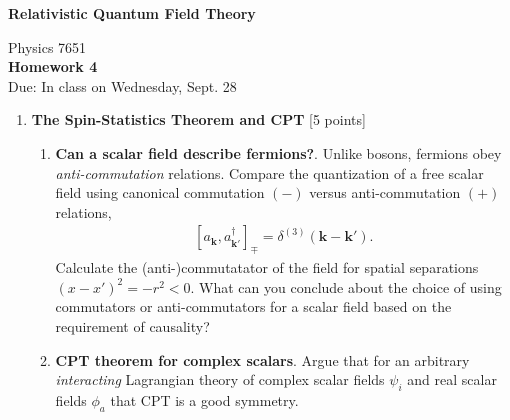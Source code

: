 \documentclass[12pt]{article}
\begin{document}
\vspace*{-1cm}
\begin{center}
{\LARGE \bf Relativistic Quantum Field Theory}

\vspace*{0.5cm}
{\Large Physics 7651} \\
\vspace*{0.5cm}
{\Large {\bf Homework 4}\\
\vspace*{0.5cm}
Due: In class on Wednesday, Sept. 28}
\end{center}
\begin{enumerate}

\item  {\bf The Spin-Statistics Theorem and CPT} [5 points]


\begin{enumerate}
	\item \textbf{Can a scalar field describe fermions?}.
	Unlike bosons, fermions obey \textit{anti-commutation} relations.
	Compare the quantization of a free scalar field using canonical commutation $(-)$ versus anti-commutation $(+)$ relations,
	\begin{align*}
		\left[a_\mathbf{k},a^\dag_{\mathbf{k'}}\right]_{\mp} = \delta^{(3)}\left(\mathbf{k}-\mathbf{k'}\right).
	\end{align*}
	Calculate the (anti-)commutatator of the field for spatial separations $(x-x')^2=-r^2<0$. What can you conclude about the choice of using commutators or anti-commutators for a scalar field based on the requirement of causality? 
	\item \textbf{CPT theorem for complex scalars}. Argue that for an arbitrary \textit{interacting} Lagrangian theory of complex scalar fields $\psi_i$ and real scalar fields $\phi_a$ that CPT is a good symmetry.
\end{enumerate}

\vspace*{0.5cm}



\end{enumerate}
\end{document}
